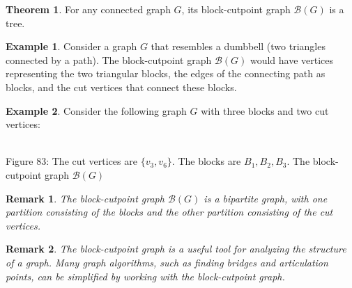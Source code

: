 \documentclass{article}
\newtheorem{remark}{Remark}
\theoremstyle{definition}
\newtheorem{example}{Example}
\newtheorem{theorem}{Theorem}
\begin{document}
\begin{theorem}
For any connected graph $G$, its block-cutpoint graph $\mathcal{B}(G)$ is a tree.
\end{theorem}

\begin{example}
Consider a graph $G$ that resembles a dumbbell (two triangles connected by a path). The block-cutpoint graph $\mathcal{B}(G)$ would have vertices representing the two triangular blocks, the edges of the connecting path as blocks, and the cut vertices that connect these blocks.
\end{example}

\begin{example}
Consider the following graph $G$ with three blocks and two cut vertices:

\begin{center}
\\
\small Figure 83: The cut vertices are $\{v_3, v_6\}$. The blocks are $B_1, B_2, B_3$. The block-cutpoint graph $\mathcal{B}(G)$ 
\end{center}
\end{example}

\begin{remark}
The block-cutpoint graph $\mathcal{B}(G)$ is a bipartite graph, with one partition consisting of the blocks and the other partition consisting of the cut vertices.
\end{remark}

\begin{remark}
The block-cutpoint graph is a useful tool for analyzing the structure of a graph. Many graph algorithms, such as finding bridges and articulation points, can be simplified by working with the block-cutpoint graph.
\end{remark}
\end{document}
